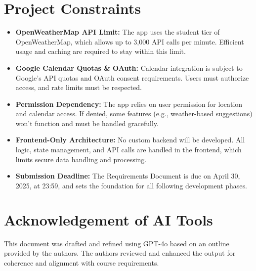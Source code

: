 \documentclass[fontsize=13pt,a4paper]{scrartcl}
\begin{document}
\section{Project Constraints}
\begin{itemize}[nosep]
  \item \textbf{OpenWeatherMap API Limit:} The app uses the student tier of OpenWeatherMap, which allows up to 3,000 API calls per minute. Efficient usage and caching are required to stay within this limit.
  \item \textbf{Google Calendar Quotas \& OAuth:} Calendar integration is subject to Google’s API quotas and OAuth consent requirements. Users must authorize access, and rate limits must be respected.
  \item \textbf{Permission Dependency:} The app relies on user permission for location and calendar access. If denied, some features (e.g., weather-based suggestions) won’t function and must be handled gracefully.
  \item \textbf{Frontend-Only Architecture:} No custom backend will be developed. All logic, state management, and API calls are handled in the frontend, which limits secure data handling and processing.
  \item \textbf{Submission Deadline:} The Requirements Document is due on April 30, 2025, at 23:59, and sets the foundation for all following development phases.
\end{itemize}

\section{Acknowledgement of AI Tools}
This document was drafted and refined using GPT-4o based on an outline provided by the authors. The authors reviewed and enhanced the output for coherence and alignment with course requirements.
\end{document}
